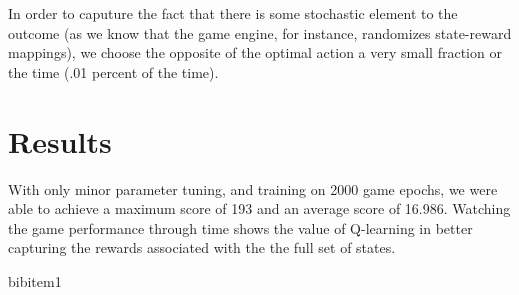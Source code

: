 \documentclass[11pt, oneside]{article}   	%
\begin{document}
\newline
In order to caputure the fact that there is some stochastic element to the outcome (as we know that the game engine, for instance, randomizes state-reward mappings), we choose the opposite of the optimal action a very small fraction or the time (.01 percent of the time).

\section*{Results}
With only minor parameter tuning, and training on 2000 game epochs, we were able to achieve a maximum score of 193 and an average score of 16.986.
\newline
Watching the game performance through time shows the value of Q-learning in better capturing the rewards associated with the the full set of states.

\begin{thebibliography}{1}

 bibitem1 
 
  \end{thebibliography}
\end{document}
